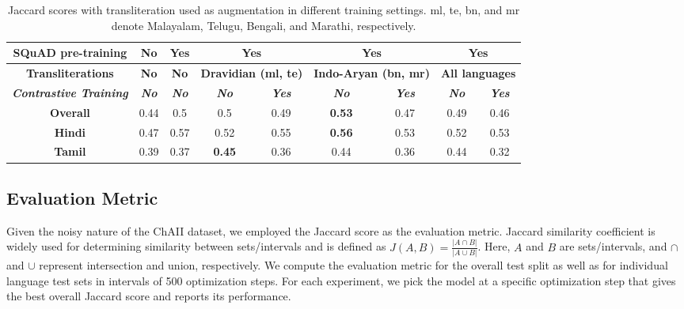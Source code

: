 \documentclass[11pt]{article}
\begin{document}
\begin{table*}[!hbt]
\centering
\begin{tabular}{|c|c|c|cc|cc|cc|}
\hline
\textbf{SQuAD pre-training}            & \textbf{No}          & \textbf{Yes}         & \multicolumn{2}{c|}{\textbf{Yes}}                & \multicolumn{2}{c|}{\textbf{Yes}}                 & \multicolumn{2}{c|}{\textbf{Yes}}             \\
\hline
\textbf{Transliterations}              & \textbf{No}          & \textbf{No}          & \multicolumn{2}{c|}{\textbf{Dravidian (ml, te)}} & \multicolumn{2}{c|}{\textbf{Indo-Aryan (bn, mr)}} & \multicolumn{2}{c|}{\textbf{All languages}}   \\
\hline
\textit{\textbf{Contrastive Training}} & \textit{\textbf{No}} & \textit{\textbf{No}} & \textit{\textbf{No}}   & \textit{\textbf{Yes}}  & \textit{\textbf{No}}   & \textit{\textbf{Yes}}   & \textit{\textbf{No}} & \textit{\textbf{Yes}} \\
\hline
\textbf{Overall}                       & 0.44                 & 0.5                  & 0.5                    & 0.49                   & \textbf{0.53}          & 0.47                    & 0.49                 & 0.46                  \\
\textbf{Hindi}                         & 0.47                 & 0.57                 & 0.52                   & 0.55                   & \textbf{0.56}          & 0.53                    & 0.52                 & 0.53                  \\
\textbf{Tamil}                         & 0.39                 & 0.37                 & \textbf{0.45}          & 0.36                   & 0.44                   & 0.36                    & 0.44                 & 0.32       \\
\hline
\end{tabular}
\caption{Jaccard scores with transliteration used as augmentation in different training settings. ml, te, bn, and mr denote Malayalam, Telugu, Bengali, and Marathi, respectively.}
\label{table:tlit}
\end{table*}

\subsection{Evaluation Metric}

Given the noisy nature of the ChAII dataset, we employed the Jaccard score as the evaluation metric. Jaccard similarity coefficient is widely used for determining similarity between sets/intervals and is defined as $J (A, B) = \frac {|A \cap B|} {|A \cup B|}$. Here, $A$ and $B$ are sets/intervals, and $\cap$ and $\cup$ represent intersection and union, respectively. We compute the evaluation metric for the overall test split as well as for individual language test sets in intervals of 500 optimization steps. For each experiment, we pick the model at a specific optimization step that gives the best overall Jaccard score and reports its performance.
\end{document}
